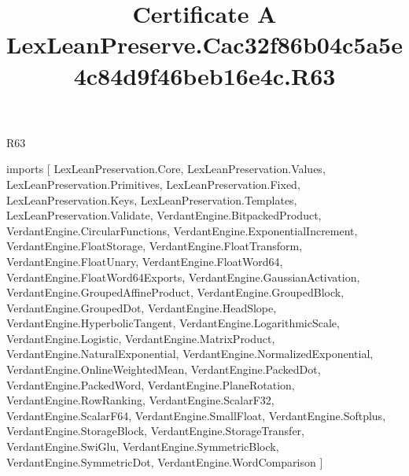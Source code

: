 \begin{lexlean}{R63}
\title{Certificate A LexLeanPreserve.Cac32f86b04c5a5e4c84d9f46beb16e4c.R63}
\begin{coremodule}
imports [
  LexLeanPreservation.Core,
  LexLeanPreservation.Values,
  LexLeanPreservation.Primitives,
  LexLeanPreservation.Fixed,
  LexLeanPreservation.Keys,
  LexLeanPreservation.Templates,
  LexLeanPreservation.Validate,
  VerdantEngine.BitpackedProduct,
  VerdantEngine.CircularFunctions,
  VerdantEngine.ExponentialIncrement,
  VerdantEngine.FloatStorage,
  VerdantEngine.FloatTransform,
  VerdantEngine.FloatUnary,
  VerdantEngine.FloatWord64,
  VerdantEngine.FloatWord64Exports,
  VerdantEngine.GaussianActivation,
  VerdantEngine.GroupedAffineProduct,
  VerdantEngine.GroupedBlock,
  VerdantEngine.GroupedDot,
  VerdantEngine.HeadSlope,
  VerdantEngine.HyperbolicTangent,
  VerdantEngine.LogarithmicScale,
  VerdantEngine.Logistic,
  VerdantEngine.MatrixProduct,
  VerdantEngine.NaturalExponential,
  VerdantEngine.NormalizedExponential,
  VerdantEngine.OnlineWeightedMean,
  VerdantEngine.PackedDot,
  VerdantEngine.PackedWord,
  VerdantEngine.PlaneRotation,
  VerdantEngine.RowRanking,
  VerdantEngine.ScalarF32,
  VerdantEngine.ScalarF64,
  VerdantEngine.SmallFloat,
  VerdantEngine.Softplus,
  VerdantEngine.StorageBlock,
  VerdantEngine.StorageTransfer,
  VerdantEngine.SwiGlu,
  VerdantEngine.SymmetricBlock,
  VerdantEngine.SymmetricDot,
  VerdantEngine.WordComparison
]


\end{coremodule}
\end{lexlean}
